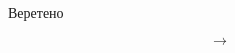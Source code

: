 \documentclass[14pt]{beamer}
\begin{document}
\begin{frame}
\begin{figure}[h]
  \begin{minipage}[h]{0.2\linewidth}
    Веретено
  \end{minipage}
  \begin{minipage}[h]{0.03\linewidth}
  \vspace{-1cm}$$\to $$
  \end{minipage}
  \begin{minipage}[h]{0.2\linewidth}

\end{minipage}
\end{figure}
\end{frame}
\end{document}
